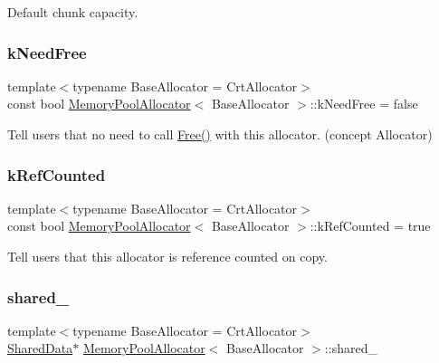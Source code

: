 Default chunk capacity. 

\mbox{\label{classMemoryPoolAllocator_ab4c7c5c631e451689bc9da392a65194f}} 
\subsubsection{\texorpdfstring{k\+Need\+Free}{kNeedFree}}
{\footnotesize\ttfamily template$<$typename Base\+Allocator = Crt\+Allocator$>$ \\
const bool \hyperlink{classMemoryPoolAllocator}{Memory\+Pool\+Allocator}$<$ Base\+Allocator $>$\+::k\+Need\+Free = false\hspace{0.3cm}{\ttfamily [static]}}



Tell users that no need to call \hyperlink{classMemoryPoolAllocator_ab2ba66e50d09ab315fbfb37f2a231f33}{Free()} with this allocator. (concept Allocator) 

\mbox{\label{classMemoryPoolAllocator_a3a18920d6afd9e9c9e62d8fd8f73e095}} 
\subsubsection{\texorpdfstring{k\+Ref\+Counted}{kRefCounted}}
{\footnotesize\ttfamily template$<$typename Base\+Allocator = Crt\+Allocator$>$ \\
const bool \hyperlink{classMemoryPoolAllocator}{Memory\+Pool\+Allocator}$<$ Base\+Allocator $>$\+::k\+Ref\+Counted = true\hspace{0.3cm}{\ttfamily [static]}}



Tell users that this allocator is reference counted on copy. 

\mbox{\label{classMemoryPoolAllocator_a17d48b0a767d489eed4241444702368c}} 
\subsubsection{\texorpdfstring{shared\+\_\+}{shared\_}}
{\footnotesize\ttfamily template$<$typename Base\+Allocator = Crt\+Allocator$>$ \\
\hyperlink{structMemoryPoolAllocator_1_1SharedData}{Shared\+Data}$\ast$ \hyperlink{classMemoryPoolAllocator}{Memory\+Pool\+Allocator}$<$ Base\+Allocator $>$\+::shared\+\_\+\hspace{0.3cm}{\ttfamily [private]}}



